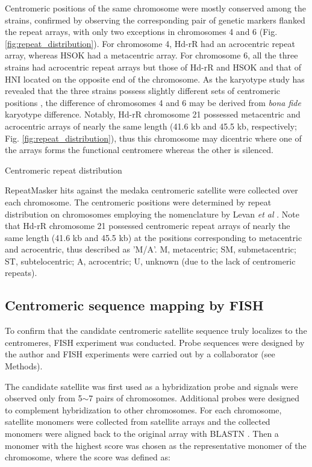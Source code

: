   Centromeric positions of the same chromosome were mostly conserved among the strains, confirmed by observing the corresponding pair of genetic markers flanked the repeat arrays, with only two exceptions in chromosomes 4 and 6 (Fig. \ref{fig:repeat_distribution}). For chromosome 4, Hd-rR had an acrocentric repeat array, whereas HSOK had a metacentric array. For chromosome 6, all the three strains had acrocentric repeat arrays but those of Hd-rR and HSOK and that of HNI located on the opposite end of the chromosome. As the karyotype study has revealed that the three strains possess slightly different sets of centromeric positions \cite{Uwa1990}, the difference of chromosomes 4 and 6 may be derived from \textit{bona fide} karyotype difference. Notably, Hd-rR chromosome 21 possessed metacentric and acrocentric arrays of nearly the same length (41.6 kb and 45.5 kb, respectively; Fig. \ref{fig:repeat_distribution}), thus this chromosome may dicentric where one of the arrays forms the functional centromere whereas the other is silenced.

  \begin{table*}[htp]
    \centering
    \caption{Centromeric repeat distribution}
    
    \label{centromeric_repeat_distribution}
    \caption*{{\small
      RepeatMasker hits against the medaka centromeric satellite were collected over each chromosome. The centromeric positions were determined by repeat distribution on chromosomes employing the nomenclature by Levan \textit{et al} \cite{Levan1964}. Note that Hd-rR chromosome 21 possessed centromeric repeat arrays of nearly the same length (41.6 kb and 45.5 kb) at the positions corresponding to metacentric and acrocentric, thus described as 'M/A'. M, metacentric; SM, submetacentric; ST, subtelocentric; A, acrocentric; U, unknown (due to the lack of centromeric repeats).
    }}
  \end{table*}


\subsection*{Centromeric sequence mapping by FISH}
  To confirm that the candidate centromeric satellite sequence truly localizes to the centromeres, FISH experiment was conducted. Probe sequences were designed by the author and FISH experiments were carried out by a collaborator (see Methods).

  The candidate satellite was first used as a hybridization probe and signals were observed only from 5$\sim$7 pairs of chromosomes. Additional probes were designed to complement hybridization to other chromosomes. For each chromosome, satellite monomers were collected from satellite arrays and the collected monomers were aligned back to the original array with BLASTN \cite{Camacho2009}. Then a monomer with the highest score was chosen as the representative monomer of the chromosome, where the score was defined as:

